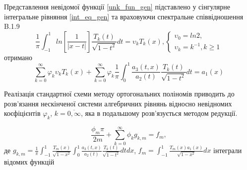 Представлення невідомої функції \eqref{unk_fun_gen} підставлено у сінгулярне інтегральне рівняння \eqref{int_eq_gen}
та враховуючи спектральне співвідношення B.1.9 \cite{ortogonal}
\begin{equation}
    \frac{1}{\pi} \int_{-1}^{1} ln\left[ \frac{1}{\lvert x - t \rvert} \right] \frac{T_k(t)}{\sqrt{1 - t^2}} dt = \upsilon_k T_k(x),
    \begin{cases}
        \upsilon_0 = ln 2, \\
        \upsilon_k = k^{-1}, k \ge 1
    \end{cases}
\end{equation} 
отримано
\begin{equation}\label{int_eq_2_gen}
    \sum_{k=0}^{\infty}  \varphi_k \upsilon_k T_{k}( x ) + \sum_{k=0}^{\infty} \varphi_k \frac{1}{\pi} \int_{0}^{1} \frac{a_3(t, x)}{a_2(t)} \frac{T_{k}(t)}{\sqrt{1 - t^2}} dt = a_1(x)
\end{equation}

Реалізація стандартної схеми методу ортогональних поліномів приводить до розв'язання нескінченої системи алгебричних рівнянь відносно невідномих коєфіцієнтів $\varphi_k$, $k=\overline{0, \infty}$,
яка в подальшому розв'язується методом редукції.

\begin{equation}\label{int_system_gen}
    \frac{\phi_m \pi}{2m} + \sum_{k=0}^{\infty} \phi_k g_{k, m} = f_m,
\end{equation}
де $g_{k, m} = \frac{1}{\pi} \int_{-1}^{1} \frac{T_{m}(x)}{\sqrt{1 - x^2}} \int_{0}^{1} \frac{a_3(t, x )}{a_2(t)} \frac{T_{k}(t)}{\sqrt{1 - t^2}} dt dx$,
$f_m = \int_{-1}^{1} \frac{T_{m}(x) a_1(x)}{\sqrt{1 - x^2}} dx$ інтеграли відомих функцій



